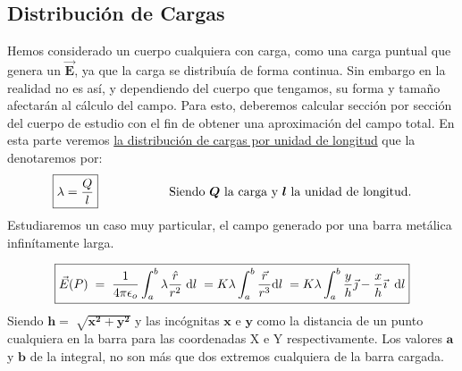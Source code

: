 \subsection{Distribución de Cargas}
\noindent Hemos considerado un cuerpo cualquiera con carga, como una carga puntual que genera un \(\bm{\vec{E}}\), ya que la carga se distribuía de forma continua. Sin embargo en la realidad no es así, y dependiendo del cuerpo que tengamos, su forma y tamaño afectarán al cálculo del campo. Para esto, deberemos calcular sección por sección del cuerpo de estudio con el fin de obtener una aproximación del campo total. En esta parte veremos \underline{la distribución de cargas por unidad de longitud} que la denotaremos por:
\[ \boxed{\lambda = \frac{Q}{l}} \hspace{2cm} \textnormal{Siendo \(\bm{Q}\) la carga y \(\bm{l}\) la unidad de longitud.}\]
Estudiaremos un caso muy particular, el campo generado por una barra metálica \\ infinítamente larga.\par
\vspace{0.5cm}
\hspace{4.5cm}
\vspace{0.5cm}
\[
        \boxed{\vec{E}(P) \hspace{1mm} = \hspace{1mm}\frac{1}{4\pi\epsilon_o}\int^{b}_{a} \lambda \frac{\hat{r}}{r^2}\hspace{1mm} \mathrm{d}l \hspace{1mm} = K\lambda \int^{b}_{a}\frac{\vec{r}}{r^3} \mathrm{d}l\hspace{1mm} = K\lambda \int_{a}^{b} \frac{y}{h}\vec{\jmath} -\frac{x}{h} \vec{\imath} \hspace{2mm}\mathrm{d}l}
\]
Siendo \(\bm{h = \sqrt[]{x^2+y^2}}\) y las incógnitas \(\bm{x}\) e \(\bm{y}\) como la distancia de un punto cualquiera en la barra para las coordenadas X e Y respectivamente. Los valores \(\bm{a}\) y \(\bm{b}\) de la integral, no son más que dos extremos cualquiera de la barra cargada.
